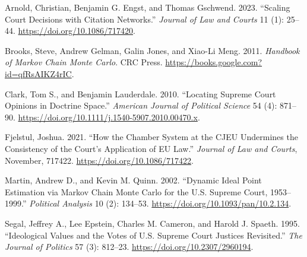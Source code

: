 \documentclass[
  11pt,
]{article}
\newlength{\cslhangindent}
\newenvironment{CSLReferences}[2] %
 {%
  \setlength{\parindent}{0pt}
  \ifodd #1 \everypar{\setlength{\hangindent}{\cslhangindent}}\ignorespaces\fi
  \ifnum #2 > 0
  \setlength{\parskip}{#2\baselineskip}
  \fi
 }%
 {}
\begin{document}
\vspace{30pt}

\hypertarget{refs}{}
\begin{CSLReferences}{1}{0}
\leavevmode{}%
Arnold, Christian, Benjamin G. Engst, and Thomas Gschwend. 2023.
{``Scaling {Court Decisions} with {Citation Networks}.''} \emph{Journal
of Law and Courts} 11 (1): 25--44. \url{https://doi.org/10.1086/717420}.

\leavevmode{}%
Brooks, Steve, Andrew Gelman, Galin Jones, and Xiao-Li Meng. 2011.
\emph{Handbook of {Markov Chain Monte Carlo}}. {CRC Press}.
\url{https://books.google.com?id=qfRsAIKZ4rIC}.

\leavevmode{}%
Clark, Tom S., and Benjamin Lauderdale. 2010. {``Locating {Supreme Court
Opinions} in {Doctrine Space}.''} \emph{American Journal of Political
Science} 54 (4): 871--90.
\url{https://doi.org/10.1111/j.1540-5907.2010.00470.x}.

\leavevmode{}%
Fjelstul, Joshua. 2021. {``How the {Chamber System} at the {CJEU
Undermines} the {Consistency} of the {Court}'s {Application} of {EU
Law}.''} \emph{Journal of Law and Courts}, November, 717422.
\url{https://doi.org/10.1086/717422}.

\leavevmode{}%
Martin, Andrew D., and Kevin M. Quinn. 2002. {``Dynamic {Ideal Point
Estimation} via {Markov Chain Monte Carlo} for the {U}.{S}. {Supreme
Court}, 1953--1999.''} \emph{Political Analysis} 10 (2): 134--53.
\url{https://doi.org/10.1093/pan/10.2.134}.

\leavevmode{}%
Segal, Jeffrey A., Lee Epstein, Charles M. Cameron, and Harold J.
Spaeth. 1995. {``Ideological {Values} and the {Votes} of {U}.{S}.
{Supreme Court Justices Revisited}.''} \emph{The Journal of Politics} 57
(3): 812--23. \url{https://doi.org/10.2307/2960194}.

\end{CSLReferences}
\end{document}
